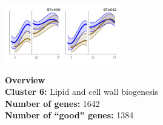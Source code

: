 \begin{multicols}{2}
\includegraphics[width=2in]{figures/clusters/root_Preflowering_5.png}
\columnbreak

\noindent \textbf{Overview}\\\textbf{Cluster 6:} Lipid and cell wall biogenesis \\
\textbf{Number of genes:} 1642 \\
\textbf{Number of ``good'' genes:} 1384 \\
\end{multicols}

